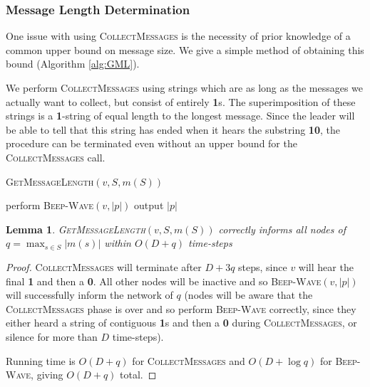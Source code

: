\documentclass{article}
\newtheorem{lemma}[theorem]{Lemma}
\begin{document}
\subsubsection{Message Length Determination}

One issue with using \textsc{CollectMessages} is the necessity of prior knowledge of a common upper bound on message size. We give a simple method of obtaining this bound (Algorithm \ref{alg:GML}).

We perform \textsc{CollectMessages} using strings which are as long as the messages we actually want to collect, but consist of entirely \textbf{1}s. The superimposition of these strings is a \textbf{1}-string of equal length to the longest message. Since the leader will be able to tell that this string has ended when it hears the substring \textbf{10}, the procedure can be terminated even without an upper bound for the \textsc{CollectMessages} call.

\begin{algorithm}
	\caption{\textsc{GetMessageLength}$(v,S,m(S))$}
	\label{alg:GML}
	\begin{algorithmic}
		\State perform \textsc{Beep-Wave}$(v,|p|)$
		\State output $|p|$
	\end{algorithmic}
\end{algorithm}

\begin{lemma}
	\textsc{GetMessageLength}$(v,S,m(S))$ correctly informs all nodes of $q = \max_{s\in S}|m(s)|$ within $O(D+q)$ time-steps
\end{lemma}

\begin{proof}
	\textsc{CollectMessages} will terminate after $D+3q$ steps, since $v$ will hear the final \textbf{1} and then a \textbf{0}. All other nodes will be inactive and so \textsc{Beep-Wave}$(v,|p|)$ will successfully inform the network of $q$ (nodes will be aware that the \textsc{CollectMessages} phase is over and so perform \textsc{Beep-Wave} correctly, since they either heard a string of contiguous \textbf{1}s and then a \textbf{0} during \textsc{CollectMessages}, or silence for more than $D$ time-steps).
	
	Running time is $O(D+q)$ for \textsc{CollectMessages} and $O(D+\log q)$ for \textsc{Beep-Wave}, giving $O(D+q)$ total.
\end{proof}
\end{document}
